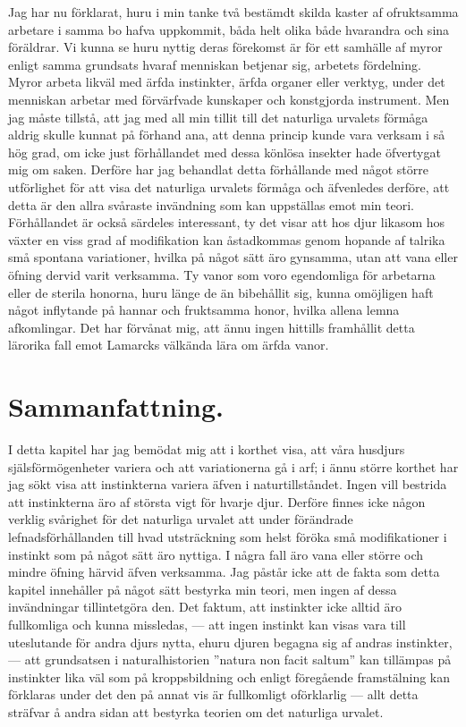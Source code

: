 Jag har nu förklarat, huru i min tanke två bestämdt skilda kaster af ofruktsamma arbetare i samma bo hafva uppkommit, båda helt olika både hvarandra och sina föräldrar. Vi kunna se huru nyttig deras förekomst är för ett samhälle af myror enligt samma grundsats hvaraf menniskan betjenar sig, arbetets fördelning. Myror arbeta likväl med ärfda instinkter, ärfda organer eller verktyg, under det menniskan arbetar med förvärfvade kunskaper och konstgjorda instrument. Men jag måste tillstå, att jag med all min tillit till det naturliga urvalets förmåga aldrig skulle kunnat på förhand ana, att denna princip kunde vara verksam i så hög grad, om icke just förhållandet med dessa könlösa insekter hade öfvertygat mig om saken. Derföre har jag behandlat detta förhållande med något större utförlighet för att visa det naturliga urvalets förmåga och äfvenledes derföre, att detta är den allra svåraste invändning som kan uppställas emot min teori. Förhållandet är också särdeles interessant, ty det visar att hos djur likasom hos växter en viss grad af modifikation kan åstadkommas genom hopande af talrika små spontana variationer, hvilka på något sätt äro gynsamma, utan att vana eller öfning dervid varit verksamma. Ty vanor som voro egendomliga för arbetarna eller de sterila honorna, huru länge de än bibehållit sig, kunna omöjligen haft något inflytande på hannar och fruktsamma honor, hvilka allena lemna afkomlingar. Det har förvånat mig, att ännu ingen hittills framhållit detta lärorika fall emot Lamarcks välkända lära om ärfda vanor.



\section{Sammanfattning.}

I detta kapitel har jag bemödat mig att i korthet visa, att våra husdjurs själsförmögenheter variera och att variationerna gå i arf; i ännu större korthet har jag sökt visa att instinkterna variera äfven i naturtillståndet. Ingen vill bestrida att instinkterna äro af största vigt för hvarje djur. Derföre finnes icke någon verklig svårighet för det naturliga urvalet att under förändrade lefnadsförhållanden till hvad utsträckning som helst föröka små modifikationer i instinkt som på något sätt äro nyttiga. I några fall äro vana eller större och mindre öfning härvid äfven verksamma. Jag påstår icke att de fakta som detta kapitel innehåller på något sätt bestyrka min teori, men ingen af dessa invändningar tillintetgöra den. Det faktum, att instinkter icke alltid äro fullkomliga och kunna missledas, — att ingen instinkt kan visas vara till uteslutande för andra djurs nytta, ehuru djuren begagna sig af andras instinkter, — att grundsatsen i naturalhistorien ”natura non facit saltum” kan tillämpas på instinkter lika väl som på kroppsbildning och enligt föregående framstälning kan förklaras under det den på annat vis är fullkomligt oförklarlig — allt detta sträfvar å andra sidan att bestyrka teorien om det naturliga urvalet.

